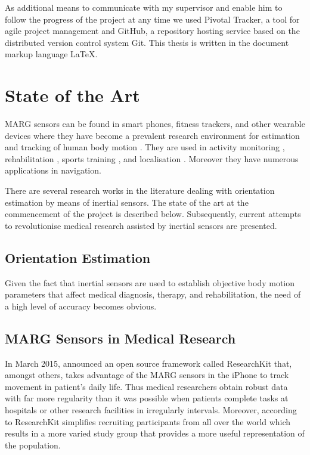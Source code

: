 As additional means to communicate with my supervisor and enable him to follow the progress of the project at any time we used Pivotal Tracker, a tool for agile project management and GitHub, a repository hosting service based on the distributed version control system Git. This thesis is written in the document markup language \LaTeX{}.

\section{State of the Art}

MARG sensors can be found in smart phones, fitness trackers, and other wearable devices where they have become a prevalent research environment for estimation and tracking of human body motion \cite{bennett_motion_2014}. They are used in activity monitoring \cite{veltink_detection_96}\cite{najafi_ambulatory_03}\cite{ermes_sports_08}, rehabilitation \cite{giggins_rehabilitation_13}\cite{lupinski_ligament_11}, sports training \cite{bonnet_squat_13}\cite{ermes_sports_08}, and localisation \cite{hoflinger_localization_13}\cite{Bennett_distance_13}. Moreover they have numerous applications in navigation.

There are several research works in the literature dealing with orientation estimation by means of inertial sensors. The state of the art at the commencement of the project is described below. Subsequently, current attempts to revolutionise medical research assisted by inertial sensors are presented.

\subsection{Orientation Estimation}

Given the fact that inertial sensors are used to establish objective body motion parameters that affect medical diagnosis, therapy, and rehabilitation, the need of a high level of accuracy becomes obvious.

\subsection{MARG Sensors in Medical Research}

In March 2015, \citeauthor{Apple_2015} announced an open source framework called ResearchKit \cite{Apple_2015} that, amongst others, takes advantage of the MARG sensors in the iPhone to track movement in patient's daily life. Thus medical researchers obtain robust data with far more regularity than it was possible when patients complete tasks at hospitals or other research facilities in irregularly intervals. Moreover, according to \citeauthor{Apple_2015} ResearchKit simplifies recruiting participants from all over the world which results in a more varied study group that provides a more useful representation of the population.

